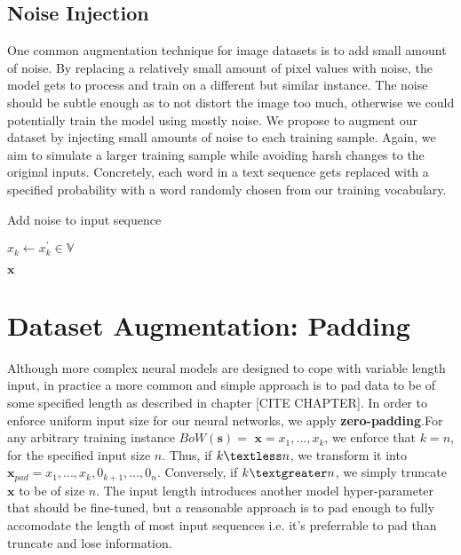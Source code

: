 \subsection{Noise Injection}
One common augmentation technique for image datasets is to add small amount of noise. By replacing a relatively small
amount of pixel values with noise, the model gets to process and train on a different but similar instance. The noise should be subtle
enough as to not distort the image too much, otherwise we could potentially train the model using mostly noise.
We propose to augment our dataset by injecting small amounts of noise to each training sample. Again, we aim to simulate
a larger training sample while avoiding harsh changes to the original inputs. Concretely, each word in a text sequence gets replaced
with a specified probability with a word randomly chosen from our training vocabulary.
\begin{algorithm}[H]
\caption{Add noise to input sequence}
\begin{algorithmic}[1]
\State$x_k \gets x^{\prime}_k \in \mathbb{V}$
\EndIf
\EndFor

\Return $\bm{x}$
\EndProcedure
\end{algorithmic}
\end{algorithm}


\section{Dataset Augmentation: Padding}

Although more complex neural models are designed to cope with variable length input,
in practice a more common and simple approach is to pad data to be of some specified
length as described in chapter [CITE CHAPTER].
In order to enforce uniform input size for our neural networks,
we apply \textbf{zero-padding}.For any arbitrary training instance $BoW(\bm{s})=$ $\bm{x} = x_1,...,x_k$, we enforce that $k = n$, for the specified input size
$n$. Thus, if $k \textless n$, we transform it into $\bm{x}_{pad} = x_1,...,x_k, 0_{k+1}, ..., 0_{n}$. Conversely, if
$k \textgreater n$, we simply truncate $\bm{x}$ to be of size $n$. The input length introduces another model hyper-parameter
that should be fine-tuned, but a reasonable approach is to pad enough to fully accomodate
the length of most input sequences i.e. it’s preferrable to pad than truncate and lose
information.

